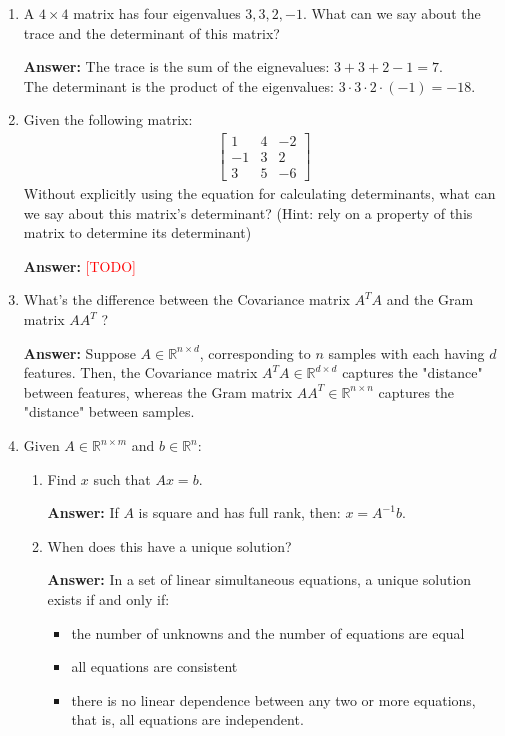 \documentclass{article}
\newenvironment{QandA}{\begin{enumerate}[label=\arabic*.]}{\end{enumerate}}
\newenvironment{InnerQandA}{\begin{enumerate}[label=\roman*.]}{\end{enumerate}}
\newenvironment{answer}{\par\normalfont \textbf{Answer:}}{}
\newcommand{\R}{\mathbb{R}}
\newcommand{\todo}{\textcolor{red}{[TODO]}}
\begin{document}
\begin{QandA}
    \item A $4 \times 4$ matrix has four eigenvalues $3,3,2,-1$. What can we say about the trace and the determinant of this matrix?
    \begin{answer}
        The trace is the sum of the eignevalues: $3+3+2-1 = 7$. \\
        The determinant is the product of the eigenvalues: $3 \cdot 3 \cdot 2 \cdot (-1) = -18$.
    \end{answer}
    
    \item Given the following matrix:
    \begin{align*}
        \begin{bmatrix}
        1 & 4 & -2 \\
        -1 & 3 & 2 \\
        3 & 5 & -6
    \end{bmatrix}
    \end{align*}
    Without explicitly using the equation for calculating determinants, what can we say about this matrix’s determinant? (Hint: rely on a property of this matrix to determine its determinant)
    \begin{answer}
        \todo 
    \end{answer}
    
    \item What’s the difference between the Covariance matrix  $A^TA$ and the Gram matrix $AA^T$ ?
    \begin{answer}
        Suppose $A \in \R^{n \times d}$, corresponding to $n$ samples with each having $d$ features. Then, the Covariance matrix $A^TA \in \R^{d \times d}$ captures the "distance" between features, whereas the Gram matrix $AA^T \in \R^{n \times n}$ captures the "distance" between samples.
    \end{answer}
    
    \item Given $A \in \R^{n \times m}$ and $b \in \R^n$:
    \begin{InnerQandA}
        \item Find $x$ such that $Ax = b$.
        \begin{answer}
            If $A$ is square and has full rank, then: $x = A^{-1}b$.
        \end{answer}
        
        \item When does this have a unique solution?
        \begin{answer}
            In a set of linear simultaneous equations, a unique solution exists if and only if: 
            \begin{itemize}
                \item the number of unknowns and the number of equations are equal
                \item all equations are consistent
                \item there is no linear dependence between any two or more equations, that is, all equations are independent.
            \end{itemize}
        \end{answer}
        

\end{InnerQandA}
\end{QandA}
\end{document}
